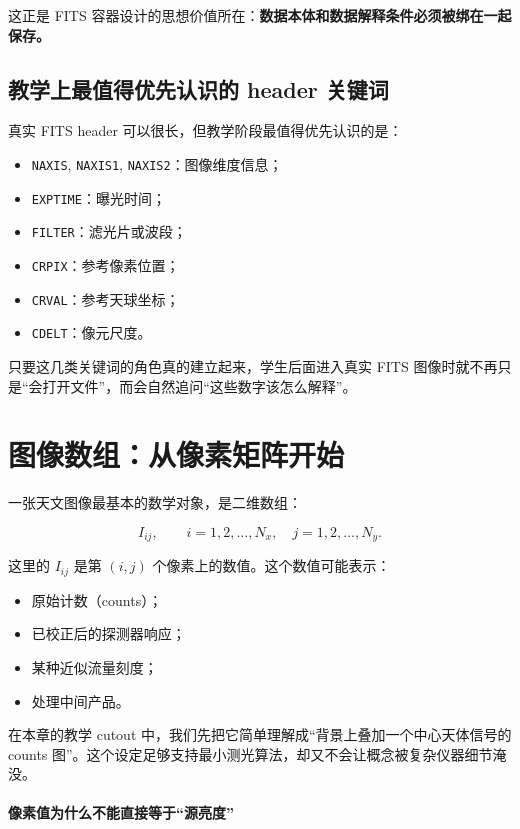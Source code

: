 这正是 FITS 容器设计的思想价值所在：\textbf{数据本体和数据解释条件必须被绑在一起保存。}

\subsection{教学上最值得优先认识的 header 关键词}

真实 FITS header 可以很长，但教学阶段最值得优先认识的是：

\begin{itemize}
    \item \texttt{NAXIS}, \texttt{NAXIS1}, \texttt{NAXIS2}：图像维度信息；
    \item \texttt{EXPTIME}：曝光时间；
    \item \texttt{FILTER}：滤光片或波段；
    \item \texttt{CRPIX}：参考像素位置；
    \item \texttt{CRVAL}：参考天球坐标；
    \item \texttt{CDELT}：像元尺度。
\end{itemize}

只要这几类关键词的角色真的建立起来，学生后面进入真实 FITS 图像时就不再只是“会打开文件”，而会自然追问“这些数字该怎么解释”。

\section{图像数组：从像素矩阵开始}

一张天文图像最基本的数学对象，是二维数组：

\[
I_{ij}, \qquad i = 1,2,\dots,N_x,\quad j = 1,2,\dots,N_y.
\]

这里的 $I_{ij}$ 是第 $(i,j)$ 个像素上的数值。这个数值可能表示：

\begin{itemize}
    \item 原始计数（counts）；
    \item 已校正后的探测器响应；
    \item 某种近似流量刻度；
    \item 处理中间产品。
\end{itemize}

在本章的教学 cutout 中，我们先把它简单理解成“背景上叠加一个中心天体信号的 counts 图”。这个设定足够支持最小测光算法，却又不会让概念被复杂仪器细节淹没。

\paragraph{像素值为什么不能直接等于“源亮度”}

